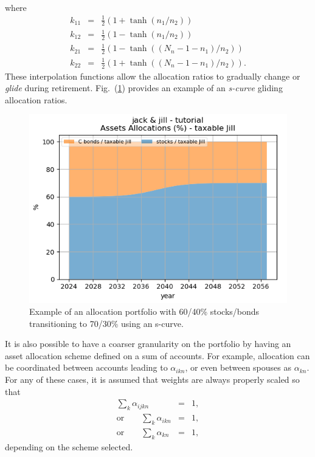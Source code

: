 \documentclass{report}[fleqn,12pt]
\begin{document}
\begin{description}[leftmargin=4em,style=multiline]
\begin{eqnarray}
	\end{eqnarray}
	where
	\begin{eqnarray}
		k_{11} &=& \frac{1}{2}(1 + \tanh(n_1/n_2)) \nonumber \\
		k_{12} &=& \frac{1}{2}(1 - \tanh(n_1/n_2)) \nonumber \\
		k_{21} &=& \frac{1}{2}(1 - \tanh((N_n-1-n_1)/n_2)) \nonumber \\
		k_{22} &=& \frac{1}{2}(1 + \tanh((N_n-1-n_1)/n_2)).
	\end{eqnarray}
	These interpolation functions allow the allocation ratios to gradually change
	or {\em glide} during retirement. Fig.~(\ref{Fig:allocations}) provides an example
	of an {\em s-curve} gliding allocation ratios.

	\begin{figure}[t]
	\includegraphics{allocations.png}
		\caption{\small Example of an allocation portfolio with 60/40\% stocks/bonds 
		transitioning to 70/30\% using an s-curve. \label{Fig:allocations}}
	\end{figure}
	It is also possible to have a coarser granularity on the portfolio by
	having an asset allocation scheme
	defined on a sum of accounts. For example, allocation can be coordinated between accounts
	leading to $\alpha_{ikn}$, or even between spouses as $\alpha_{kn}$.
	For any of these cases, it is assumed that weights are always properly scaled so that
	\begin{eqnarray}
		\sum_{k} \alpha_{ijkn} &=& 1, \nonumber\\
		\text{or} \qquad \sum_{k} \alpha_{ikn} &=& 1, \nonumber\\
		\text{or} \qquad \sum_{k} \alpha_{kn} &=& 1,
	\end{eqnarray}
	depending on the scheme selected.


\end{description}
\end{document}
